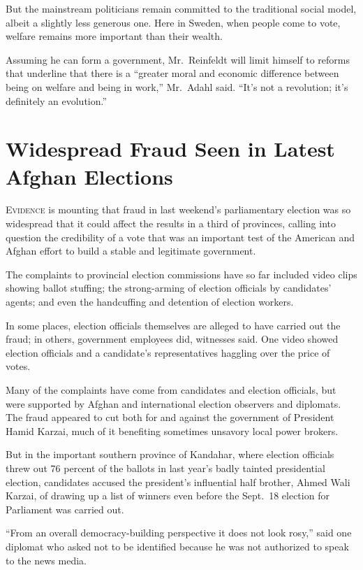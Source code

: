 ﻿\documentclass[12pt]{article}
\begin{document}
But the mainstream politicians remain committed to the traditional social model, albeit a slightly
less generous one. Here in Sweden, when people come to vote, welfare remains more important than
their wealth.

Assuming he can form a government, Mr.~Reinfeldt will limit himself to reforms that underline that
there is a ``greater moral and economic difference between being on welfare and being in work,''
Mr.~Adahl said. ``It's not a revolution; it's definitely an evolution.''

\pagebreak
\section{Widespread Fraud Seen in Latest Afghan Elections}

\lettrine{E}{vidence} is mounting that fraud in last weekend's
parliamentary election was so widespread that it could affect the results in a third of provinces,
calling into question the credibility of a vote that was an important test of the American and
Afghan effort to build a stable and legitimate government.

The complaints to provincial election commissions have so far included video clips showing ballot
stuffing; the strong-arming of election officials by candidates' agents; and even the handcuffing
and detention of election workers.

In some places, election officials themselves are alleged to have carried out the fraud; in others,
government employees did, witnesses said. One video showed election officials and a candidate's
representatives haggling over the price of votes.

Many of the complaints have come from candidates and election officials, but were supported by
Afghan and international election observers and diplomats. The fraud appeared to cut both for and
against the government of President Hamid Karzai, much of it benefiting sometimes unsavory local
power brokers.

But in the important southern province of Kandahar, where election officials threw out 76 percent of
the ballots in last year's badly tainted presidential election, candidates accused the president's
influential half brother, Ahmed Wali Karzai, of drawing up a list of winners even before the
Sept.~18 election for Parliament was carried out.

``From an overall democracy-building perspective it does not look rosy,'' said one diplomat who
asked not to be identified because he was not authorized to speak to the news media.
\end{document}
